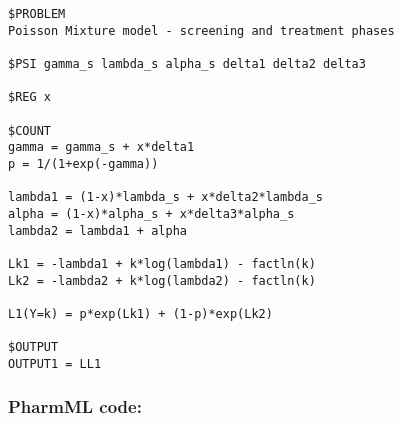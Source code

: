 \myStartLine
\lstset{language=MLXTRANcode}
\begin{lstlisting}
$PROBLEM 
Poisson Mixture model - screening and treatment phases 

$PSI gamma_s lambda_s alpha_s delta1 delta2 delta3 

$REG x

$COUNT
gamma = gamma_s + x*delta1 
p = 1/(1+exp(-gamma))

lambda1 = (1-x)*lambda_s + x*delta2*lambda_s
alpha = (1-x)*alpha_s + x*delta3*alpha_s
lambda2 = lambda1 + alpha

Lk1 = -lambda1 + k*log(lambda1) - factln(k) 
Lk2 = -lambda2 + k*log(lambda2) - factln(k)

L1(Y=k) = p*exp(Lk1) + (1-p)*exp(Lk2)

$OUTPUT
OUTPUT1 = LL1
\end{lstlisting}
\myEndLine

\subsubsection{PharmML code:}

